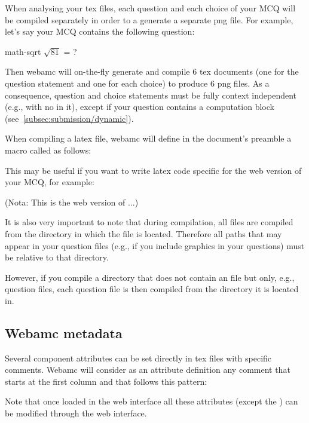 When analysing your tex files, each question and each choice of your
MCQ will be compiled separately in order to a generate a separate png
file. For example, let's say your MCQ contains the following question:
\begin{tex}
\begin{questionmult}{math-sqrt}
    $\sqrt{81}$ = ?
    \begin{choices}
    \end{choices}
\end{questionmult}
\end{tex}

Then webamc will on-the-fly generate and compile 6 tex documents (one
for the question statement and one for each choice) to produce 6 png
files. As a consequence, question and choice statements must be fully
context independent (e.g., with no \lstinlinetex{\\label} in it),
except if your question contains a computation block
(see~\cref{subsec:submission/dynamic}).

When compiling a latex file, webamc will define in the document's
preamble a macro called  as follows:
\begin{tex}
\def\WEBAMC{1}
\end{tex}

This may be useful if you want to write latex code specific for the
web version of your MCQ, for example:
\begin{tex}
\ifdefined\WEBAMC
(Nota: This is the web version of ...)
\fi
\end{tex}

It is also very important to note that during compilation, all files
are compiled from the directory in which the  file is
located. Therefore all paths that may appear in your question files
(e.g., if you include graphics in your questions) must be relative to
that directory.

However, if you compile a directory that does not contain an
 file but only, e.g., question files, each question
file is then compiled from the directory it is located in.
\subsection{Webamc metadata}
\label{subsec:submission/metadata}
Several component attributes can be set directly in tex files with
specific comments. Webamc will consider as an attribute definition any
comment that starts at the first column and that follows this pattern:
\begin{tex}
\end{tex}
Note that once loaded in the web interface all these attributes
(except the ) can be modified through the web interface.
